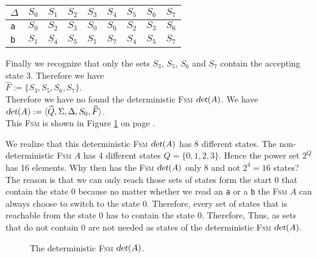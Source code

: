 \begin{center}
\begin{tabular}[t]{|l||c|c|c|c|c|c|c|c|}
\hline
$\Delta$ & $S_0$ & $S_1$ & $S_2$ & $S_3$ & $S_4$ & $S_5$ & $S_6$ & $S_7$ \\
\hline
\hline
\texttt{a} & $S_0$ & $S_2$ & $S_3$ & $S_0$ & $S_6$ & $S_2$ & $S_3$ & $S_6$ \\
\hline
\texttt{b} & $S_1$ & $S_4$ & $S_5$ & $S_1$ & $S_7$ & $S_4$ & $S_5$ & $S_7$ \\
\hline
\end{tabular}
\end{center}
Finally we recognize that only the sets  $S_3$, $S_5$, $S_6$ and $S_7$ contain the accepting state
 $3$.  Therefore we have
\\[0.2cm]
\hspace*{1.3cm}
$\widehat{F} := \{ S_3, S_5, S_6, S_7 \}$.
\\[0.2cm]
Therefore we have no found the deterministic \textsc{Fsm} $\textsl{det}(A)$. We have
\\[0.2cm]
\hspace*{1.3cm}
$\textsl{det}(A) := \langle \widehat{Q}, \Sigma, \Delta, S_0, \widehat{F}\rangle$.
\\[0.2cm]
This \textsc{Fsm} is shown in Figure \ref{fig:a2.eps} on page \pageref{fig:a2.eps}.

We realize that this deterministic \textsc{Fsm} $\textsl{det}(A)$ has 8 different states. 
The non-deterministic \textsc{Fsm} $A$ has 4 different states
 $Q = \{ 0, 1, 2, 3 \}$.  Hence the power set $2^Q$ has 16 elements.
Why then has the \textsc{Fsm} $\textsl{det}(A)$ only 8 and not $2^4 = 16$ states?
The reason is that we can only reach those sets of states form the start $0$
that contain the state $0$ because no matter whether we read an \texttt{a} or a \texttt{b}
the \textsc{Fsm} $A$ can always choose to switch to the state $0$.  Therefore, every set of states that is
reachable from the state $0$ has to contain the state $0$.  Therefore, 
Thus, as sets that do not contain $0$ are not needed as states of the deterministic \textsc{Fsm}
$\textsl{det}(A)$.



\begin{figure}[!ht]
  \centering
     \vspace*{0.5cm}
  \caption{The deterministic \textsc{Fsm} $\textsl{det}(A)$.}
  \label{fig:a2.eps}
\end{figure}


